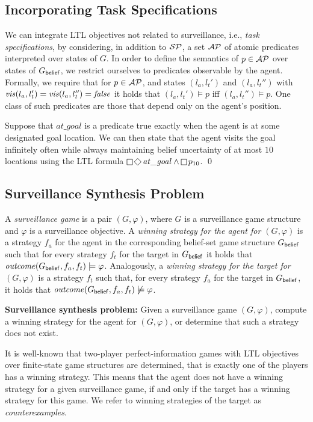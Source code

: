 \subsection{Incorporating Task Specifications}
We can integrate LTL objectives not related to surveillance, i.e., \emph{task specifications}, by considering, in addition to $\mathcal{SP}$, a set $\mathcal{AP}$ of atomic predicates interpreted over states of $G$. In order to define the semantics of $p \in \mathcal{AP}$ over states of $G_{\mathsf{belief}}$, we restrict ourselves to predicates observable by the agent. 
Formally, we require that for $p \in \mathcal{AP}$, and states $(l_a,l_t')$ and $(l_a,l_t'')$ with $\mathit{vis}(l_a,l_t')=\mathit{vis}(l_a,l_t'')=\mathit{false}$ it holds that $(l_a,l_t') \models p$ iff $(l_a,l_t'') \models p$. One class of such predicates are those that depend only on the agent's position.

\begin{example}
Suppose that $\mathit{at\_goal}$ is a predicate true exactly when the agent is at some designated goal location. We can then state that the agent visits the goal infinitely often while always maintaining belief uncertainty of at most $10$ locations using the LTL formula $\LTLglobally\LTLfinally \mathit{at\_goal} \wedge \LTLglobally p_{10}$.
\qed
\end{example}

\subsection{Surveillance Synthesis Problem}
A \emph{surveillance game} is a pair $(G,\varphi)$, where $G$ is a surveillance game structure and $\varphi$ is a surveillance objective. A \emph{winning strategy for the agent for $(G,\varphi)$} is a strategy $f_a$ for the agent in the corresponding belief-set game structure $G_{\mathsf{belief}}$ such that for every strategy $f_t$ for the target in $G_{\mathsf{belief}}$ it holds that $\mathit{outcome}(G_{\mathsf{belief}},f_a,f_t) \models \varphi$. Analogously, a \emph{winning strategy for the target for $(G,\varphi)$} is a strategy $f_t$ such that, for every strategy $f_a$ for the target in $G_{\mathsf{belief}}$, it holds that $\mathit{outcome}(G_{\mathsf{belief}},f_a,f_t) \not\models \varphi$.

{\bf Surveillance synthesis problem:} Given a surveillance game $(G,\varphi)$, compute a winning strategy for the agent for $(G,\varphi)$, or determine that such a strategy does not exist.


It is well-known that two-player perfect-information games with LTL objectives over finite-state game structures are determined, that is exactly one of the players has a winning strategy. This means that the agent does not have a winning strategy for a given surveillance game, if and only if the target has a winning strategy for this game. We refer to winning strategies of the target as \emph{counterexamples}.